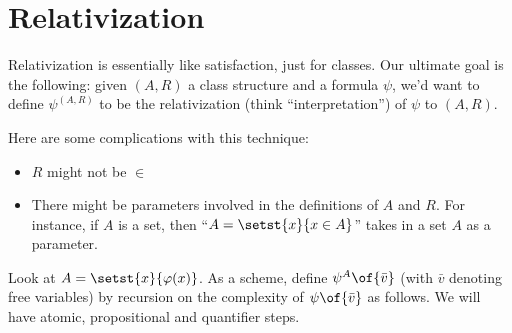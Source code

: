 
\section{Relativization} %

Relativization is essentially like satisfaction, just for classes. Our ultimate goal is the following: given $(A, R)$ a class structure and a formula $\psi$, we'd want to define $\psi^{(A, R)}$ to be the relativization (think ``interpretation'') of $\psi$ to $(A, R)$.

Here are some complications with this technique:
\begin{itemize}
    \item $R$ might not be $\in$
    \item There might be parameters involved in the definitions of $A$ and $R$. For instance, if $A$ is a set, then ``$A = \setst{x}{x \in A}$'' takes in a set $A$ as a parameter.
\end{itemize}

Look at $A = \setst{x}{\varphi(x)}$. As a scheme, define $\psi^A\of{\bar{v}}$ (with $\bar{v}$ denoting free variables) by recursion on the complexity of $\psi\of{\bar{v}}$ as follows. We will have atomic, propositional and quantifier steps.

